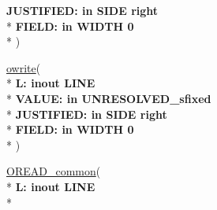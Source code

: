 \begin{DoxyCompactItemize}
  {\bfseries \textcolor{vhdlchar}{ }\textcolor{vhdlchar}{J\+U\+S\+T\+I\+F\+I\+E\+D\+: }\textcolor{stringliteral}{} {\bfseries \textcolor{keywordflow}{in}\textcolor{vhdlchar}{ }\textcolor{vhdlchar}{S\+I\+D\+E}\textcolor{vhdlchar}{ }\textcolor{vhdlchar}{ }\textcolor{vhdlchar}{ }\textcolor{vhdlchar}{ }\textcolor{vhdlchar}{ }\textcolor{vhdlkeyword}{right}\textcolor{vhdlchar}{ }}}\\*
  {\bfseries \textcolor{vhdlchar}{ }\textcolor{vhdlchar}{F\+I\+E\+L\+D\+: }\textcolor{stringliteral}{} {\bfseries \textcolor{keywordflow}{in}\textcolor{vhdlchar}{ }\textcolor{vhdlchar}{W\+I\+D\+T\+H}\textcolor{vhdlchar}{ }\textcolor{vhdlchar}{ }\textcolor{vhdlchar}{ } \textcolor{vhdldigit}{0} \textcolor{vhdlchar}{ }}}\\*
   )
\item 
{\bfseries {\bfseries \textcolor{vhdlchar}{ }}} \hyperlink{class__fixed__pkg_a5d58f9f26562a215affad21f3ae0d368}{owrite}( \\*
{\bfseries \textcolor{vhdlchar}{ }\textcolor{vhdlchar}{L\+: }\textcolor{stringliteral}{} {\bfseries \textcolor{keywordflow}{inout}\textcolor{vhdlchar}{ }\textcolor{vhdlchar}{L\+I\+N\+E}\textcolor{vhdlchar}{ }}}\\*
  {\bfseries \textcolor{vhdlchar}{ }\textcolor{vhdlchar}{V\+A\+L\+U\+E\+: }\textcolor{stringliteral}{} {\bfseries \textcolor{keywordflow}{in}\textcolor{vhdlchar}{ }\textcolor{vhdlchar}{U\+N\+R\+E\+S\+O\+L\+V\+E\+D\+\_\+sfixed}\textcolor{vhdlchar}{ }}}\\*
  {\bfseries \textcolor{vhdlchar}{ }\textcolor{vhdlchar}{J\+U\+S\+T\+I\+F\+I\+E\+D\+: }\textcolor{stringliteral}{} {\bfseries \textcolor{keywordflow}{in}\textcolor{vhdlchar}{ }\textcolor{vhdlchar}{S\+I\+D\+E}\textcolor{vhdlchar}{ }\textcolor{vhdlchar}{ }\textcolor{vhdlchar}{ }\textcolor{vhdlchar}{ }\textcolor{vhdlchar}{ }\textcolor{vhdlkeyword}{right}\textcolor{vhdlchar}{ }}}\\*
  {\bfseries \textcolor{vhdlchar}{ }\textcolor{vhdlchar}{F\+I\+E\+L\+D\+: }\textcolor{stringliteral}{} {\bfseries \textcolor{keywordflow}{in}\textcolor{vhdlchar}{ }\textcolor{vhdlchar}{W\+I\+D\+T\+H}\textcolor{vhdlchar}{ }\textcolor{vhdlchar}{ }\textcolor{vhdlchar}{ } \textcolor{vhdldigit}{0} \textcolor{vhdlchar}{ }}}\\*
   )
\item 
{\bfseries {\bfseries \textcolor{vhdlchar}{ }}} \hyperlink{class__fixed__pkg_aeef6269be56d1948f9d91d4d15e2e42c}{O\+R\+E\+A\+D\+\_\+common}( \\*
{\bfseries \textcolor{vhdlchar}{ }\textcolor{vhdlchar}{L\+: }\textcolor{stringliteral}{} {\bfseries \textcolor{keywordflow}{inout}\textcolor{vhdlchar}{ }\textcolor{vhdlchar}{L\+I\+N\+E}\textcolor{vhdlchar}{ }}}\\*

\end{DoxyCompactItemize}
